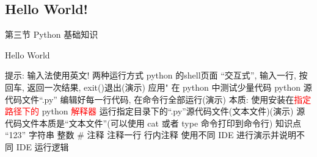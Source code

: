 \subsection{Hello World!}

\begin{frame}[standout] 第三节 \quad Python 基础知识 \end{frame}

\begin{frame}{Hello World}
    \begin{myoutline}
        \1 提示: 输入法使用英文!
        \1 两种运行方式
            \2 python 的shell页面
                \3 ``交互式'', 输入一行, 按回车, 返回一次结果, exit()退出(演示)
                \3 应用" 在 python 中测试少量代码
            \2 python 源代码文件``.py''
                \3 编辑好每一行代码, 在命令行全部运行(演示)
                \3 本质: 使用安装在\textcolor{red}{指定路径下的} python \textcolor{red}{解释器} 运行指定目录下的``.py''源代码文件(文本文件)(演示)
            \2 源代码文件本质是``文本文件''(可以使用 cat 或者 type 命令打印到命令行)
        \1 知识点
            \2 ``123'' 字符串
             整数
            \2 \# 注释
                \3 注释一行
                \3 行内注释
        \1 使用不同 IDE 进行演示并说明不同 IDE 运行逻辑
    \end{myoutline}
\end{frame}












